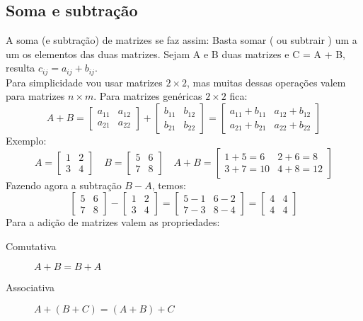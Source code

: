 \subsection{Soma e subtração}
A soma (e subtração) de matrizes se faz assim: Basta somar ( ou subtrair ) um a um os elementos das duas matrizes.
Sejam A e B duas matrizes e C = A + B, resulta $c_{ij}=a_{ij}+b_{ij}$.\\
Para simplicidade vou usar matrizes $2 \times 2$, mas muitas dessas operações valem para matrizes $n \times m$. Para matrizes genéricas $2 \times 2$ fica:
\begin{displaymath}
  A+B=
  \begin{bmatrix}
  a_{11} & a_{12}\\a_{21} & a_{22}  
  \end{bmatrix}
  +
  \begin{bmatrix}
  b_{11} & b_{12}\\b_{21} & b_{22}  
  \end{bmatrix}
  =
  \begin{bmatrix}
  a_{11}+b_{11} & a_{12}+b_{12}\\a_{21}+b_{21} & a_{22}+b_{22}  
  \end{bmatrix}
\end{displaymath}
Exemplo:
\begin{displaymath}
A=
\begin{bmatrix}
  1 & 2 \\ 3 & 4
\end{bmatrix}
 \quad B=\begin{bmatrix}
 5 & 6 \\ 7 & 8 \end{bmatrix}
\quad A + B =
\begin{bmatrix}
  1+5=6 & 2+6=8\\
  3+7=10 & 4+8=12
  \end{bmatrix}
\end{displaymath}
Fazendo agora a subtração $ B-A $, temos:
\begin{displaymath}
\begin{bmatrix}
5 & 6 \\
7 & 8
\end{bmatrix}
-
\begin{bmatrix}
1 & 2 \\ 
3 & 4
\end{bmatrix}
=
\begin{bmatrix}
5-1 & 6-2 \\ 
7-3 & 8-4
\end{bmatrix}
=
\begin{bmatrix}
4 & 4 \\ 
4 & 4
\end{bmatrix} 
\end{displaymath}
Para a adição de matrizes valem as propriedades:
\begin{description}
\item[Comutativa] $A+B=B+A$
\item[Associativa]$ A+(B+C)=(A+B)+C $
\end{description}
